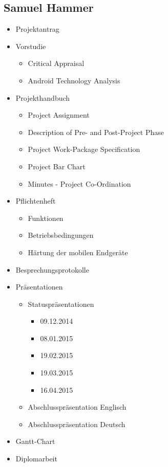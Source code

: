 \hfill
\begin{minipage}[t]{0.47\textwidth}
	\subsection{Samuel Hammer}
	\begin{itemize}
		\item Projektantrag
		\item Vorstudie
		\begin{itemize}
			\item Critical Appraisal
			\item Android Technology Analysis
		\end{itemize}
		\item Projekthandbuch
		\begin{itemize}
			\item Project Assignment
			\item Description of Pre- and Post-Project Phase
			\item Project Work-Package Specification
			\item Project Bar Chart
			\item Minutes - Project Co-Ordination
		\end{itemize}
		\item Pflichtenheft
		\begin{itemize}
			\item Funktionen
			\item Betriebsbedingungen
			\item Härtung der mobilen Endgeräte
		\end{itemize}
		\item Besprechungsprotokolle
		\item Präsentationen
		\begin{itemize}
			\item Statuspräsentationen
			\begin{itemize}
				\item 09.12.2014
				\item 08.01.2015
				\item 19.02.2015
				\item 19.03.2015
				\item 16.04.2015
			\end{itemize}
			\item Abschlusspräsentation Englisch
			\item Abschlusspräsentation Deutsch
		\end{itemize}
		\item Gantt-Chart
		\item Diplomarbeit
	\end{itemize}
\end{minipage}%

